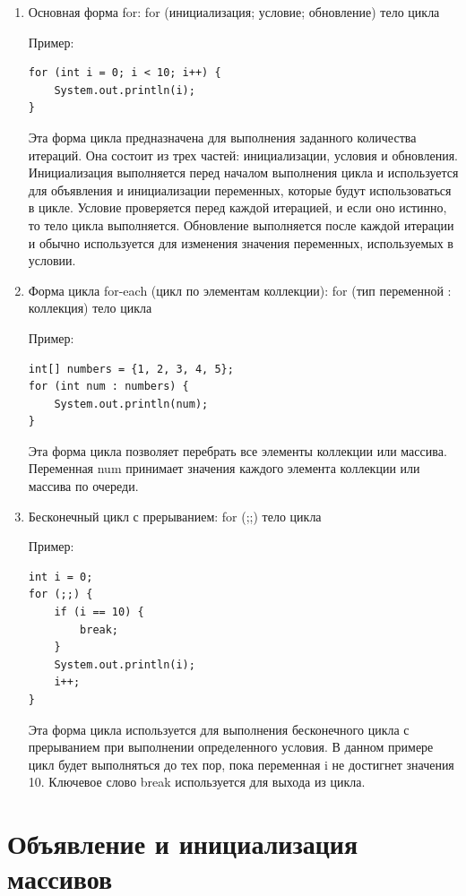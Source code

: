 \begin{enumerate}
    \item Основная форма for: for (инициализация; условие; обновление) { тело цикла }

Пример:

\begin{lstlisting}
for (int i = 0; i < 10; i++) {
    System.out.println(i);
}
\end{lstlisting}

Эта форма цикла предназначена для выполнения заданного количества итераций. Она состоит из трех частей: инициализации, условия и обновления. Инициализация выполняется перед началом выполнения цикла и используется для объявления и инициализации переменных, которые будут использоваться в цикле. Условие проверяется перед каждой итерацией, и если оно истинно, то тело цикла выполняется. Обновление выполняется после каждой итерации и обычно используется для изменения значения переменных, используемых в условии.
    \item Форма цикла for-each (цикл по элементам коллекции): for (тип переменной : коллекция) { тело цикла }

Пример:

\begin{lstlisting}
int[] numbers = {1, 2, 3, 4, 5};
for (int num : numbers) {
    System.out.println(num);
}
\end{lstlisting}

Эта форма цикла позволяет перебрать все элементы коллекции или массива. Переменная num принимает значения каждого элемента коллекции или массива по очереди.
    \item Бесконечный цикл с прерыванием: for (;;) { тело цикла }

Пример:

\begin{lstlisting}
int i = 0;
for (;;) {
    if (i == 10) {
        break;
    }
    System.out.println(i);
    i++;
}
\end{lstlisting}

Эта форма цикла используется для выполнения бесконечного цикла с прерыванием при выполнении определенного условия. В данном примере цикл будет выполняться до тех пор, пока переменная i не достигнет значения 10. Ключевое слово break используется для выхода из цикла.
\end{enumerate}

\section{Объявление и инициализация массивов}


